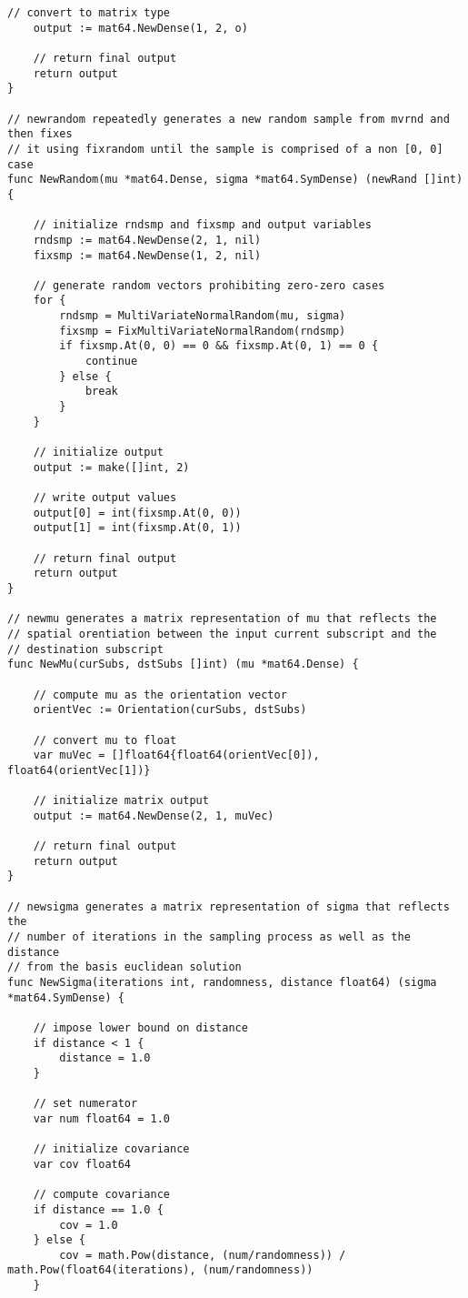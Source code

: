 \begin{lstlisting}[basicstyle=\tiny]
	// convert to matrix type
	output := mat64.NewDense(1, 2, o)

	// return final output
	return output
}

// newrandom repeatedly generates a new random sample from mvrnd and then fixes
// it using fixrandom until the sample is comprised of a non [0, 0] case
func NewRandom(mu *mat64.Dense, sigma *mat64.SymDense) (newRand []int) {

	// initialize rndsmp and fixsmp and output variables
	rndsmp := mat64.NewDense(2, 1, nil)
	fixsmp := mat64.NewDense(1, 2, nil)

	// generate random vectors prohibiting zero-zero cases
	for {
		rndsmp = MultiVariateNormalRandom(mu, sigma)
		fixsmp = FixMultiVariateNormalRandom(rndsmp)
		if fixsmp.At(0, 0) == 0 && fixsmp.At(0, 1) == 0 {
			continue
		} else {
			break
		}
	}

	// initialize output
	output := make([]int, 2)

	// write output values
	output[0] = int(fixsmp.At(0, 0))
	output[1] = int(fixsmp.At(0, 1))

	// return final output
	return output
}

// newmu generates a matrix representation of mu that reflects the
// spatial orentiation between the input current subscript and the
// destination subscript
func NewMu(curSubs, dstSubs []int) (mu *mat64.Dense) {

	// compute mu as the orientation vector
	orientVec := Orientation(curSubs, dstSubs)

	// convert mu to float
	var muVec = []float64{float64(orientVec[0]), float64(orientVec[1])}

	// initialize matrix output
	output := mat64.NewDense(2, 1, muVec)

	// return final output
	return output
}

// newsigma generates a matrix representation of sigma that reflects the
// number of iterations in the sampling process as well as the distance
// from the basis euclidean solution
func NewSigma(iterations int, randomness, distance float64) (sigma *mat64.SymDense) {

	// impose lower bound on distance
	if distance < 1 {
		distance = 1.0
	}

	// set numerator
	var num float64 = 1.0

	// initialize covariance
	var cov float64

	// compute covariance
	if distance == 1.0 {
		cov = 1.0
	} else {
		cov = math.Pow(distance, (num/randomness)) / math.Pow(float64(iterations), (num/randomness))
	}


\end{lstlisting}
